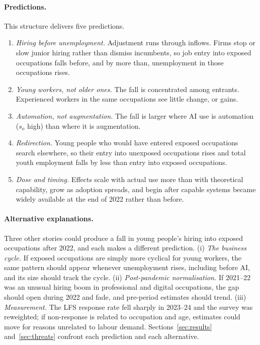 \documentclass[11pt]{article}
\begin{document}
\paragraph{Predictions.} This structure delivers five predictions.
\begin{enumerate}[label=\textbf{P\arabic*.}]
  \item \emph{Hiring before unemployment.} Adjustment runs through inflows. Firms stop or slow junior hiring rather than dismiss incumbents, so job entry into exposed occupations falls before, and by more than, unemployment in those occupations rises.
  \item \emph{Young workers, not older ones.} The fall is concentrated among entrants. Experienced workers in the same occupations see little change, or gains.
  \item \emph{Automation, not augmentation.} The fall is larger where AI use is automation ($s_o$ high) than where it is augmentation.
  \item \emph{Redirection.} Young people who would have entered exposed occupations search elsewhere, so their entry into unexposed occupations rises and total youth employment falls by less than entry into exposed occupations.
  \item \emph{Dose and timing.} Effects scale with actual use more than with theoretical capability, grow as adoption spreads, and begin after capable systems became widely available at the end of 2022 rather than before.
\end{enumerate}

\paragraph{Alternative explanations.} Three other stories could produce a fall in young people's hiring into exposed occupations after 2022, and each makes a different prediction. (i) \emph{The business cycle.} If exposed occupations are simply more cyclical for young workers, the same pattern should appear whenever unemployment rises, including before AI, and its size should track the cycle. (ii) \emph{Post-pandemic normalisation.} If 2021--22 was an unusual hiring boom in professional and digital occupations, the gap should open during 2022 and fade, and pre-period estimates should trend. (iii) \emph{Measurement.} The LFS response rate fell sharply in 2023--24 and the survey was reweighted; if non-response is related to occupation and age, estimates could move for reasons unrelated to labour demand. Sections~\ref{sec:results} and~\ref{sec:threats} confront each prediction and each alternative.
\end{document}
